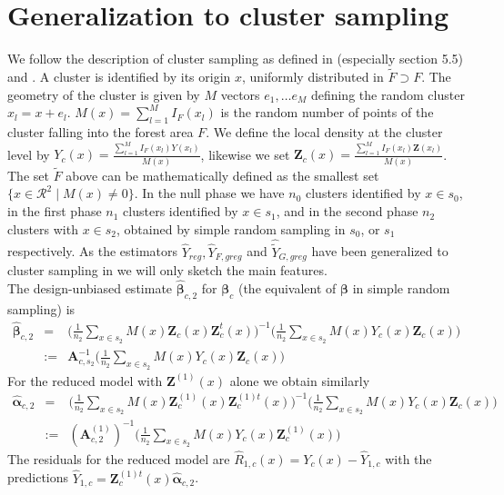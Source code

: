 \documentclass[a4paper,12pt,leqno, titlepage]{article}
\begin{document}
\section{Generalization to cluster sampling}
We follow the description of cluster sampling as defined in \cite{mandallaz} (especially section 5.5) and \cite{mandallazreport1}. A cluster is identified by its origin $x$, uniformly distributed in $\tilde{F}\supset F$. The geometry of the cluster is given by $M$ vectors $e_1,\ldots e_M$ defining the random cluster $x_l=x+e_l$. $M(x)=\sum_{l=1}^MI_{F}(x_l)$ is the random number of points of the cluster falling into the forest area $F$. We define the local density at the cluster level by $Y_c(x)=\frac{\sum_{l=1}^MI_{F}(x_l)Y(x_l)}{M(x)}$, likewise we set $\pmb{Z}_c(x)=\frac{\sum_{l=1}^MI_{F}(x_l)\pmb{Z}(x_l)}{M(x)}$. The set $\tilde{F}$ above can be mathematically defined as the smallest set $\{x\in{\mathcal{R}}^2 \mid M(x) \ne 0 \}$. In the null phase we have $n_0$ clusters identified by $x\in{s_0}$, in the first phase $n_1$ clusters identified by $x\in{s_1}$, and in the second phase $n_2$ clusters with $x\in{s_2}$, obtained by simple random sampling in $s_0$, or $s_1$ respectively.
As the estimators $\hat{Y}_{reg},\hat{Y}_{F,greg}$ and $\hat{\tilde{Y}}_{G,greg}$ have been generalized to cluster sampling in \cite{mandallazreport2,mandallaz3,mandallaz4} we will only sketch the main features. \\
The design-unbiased estimate $\hat{\pmb{\beta}}_{c,2}$  for $\pmb{\beta}_c$ (the equivalent of $\pmb{\beta}$ in simple random sampling) is
 \begin{eqnarray}\label{estbetacluster1}
 \hat{\pmb{\beta}}_{c,2}&=&
 \Big(\frac{1}{n_2}\sum_{x\in{s_2}}M(x)\pmb{Z}_c(x)\pmb{Z}_c^t(x)\Big)^{-1}
 \Big(\frac{1}{n_2}\sum_{x\in{s_2}}M(x)Y_c(x)\pmb{Z}_c(x)\Big)
 \nonumber\\
 &:=&\pmb{A}^{-1}_{c,s_2}\Big(\frac{1}{n_2}\sum_{x\in{s_2}}M(x)Y_c(x)\pmb{Z}_c(x)\Big)
 \end{eqnarray}
For the reduced model with $\pmb{Z}^{(1)}(x)$ alone we obtain similarly
\begin{eqnarray}\label{estalphacluster1}
 \hat{\pmb{\alpha}}_{c,2}&=&
 \Big(\frac{1}{n_2}\sum_{x\in{s_2}}M(x)\pmb{Z}^{(1)}_c(x)\pmb{Z}_c^{(1)t}(x)\Big)^{-1}\Big(\frac{1}{n_2}\sum_{x\in{s_2}}M(x)Y_c(x)\pmb{Z}_c(x)\Big)
 \nonumber\\
 &:=&(\pmb{A}^{(1)}_{c,2})^{-1}\Big(\frac{1}{n_2}\sum_{x\in{s_2}}M(x)Y_c(x)\pmb{Z}^{(1)}_c(x)\Big)
 \end{eqnarray}
 The residuals for the reduced model are $\hat{R}_{1,c}(x)=Y_c(x)-\hat{Y}_{1,c}$ with the predictions $\hat{Y}_{1,c}=\pmb{Z}^{(1)t}_c(x)\hat{\pmb{\alpha}}_{c,2}$.\\
\end{document}
